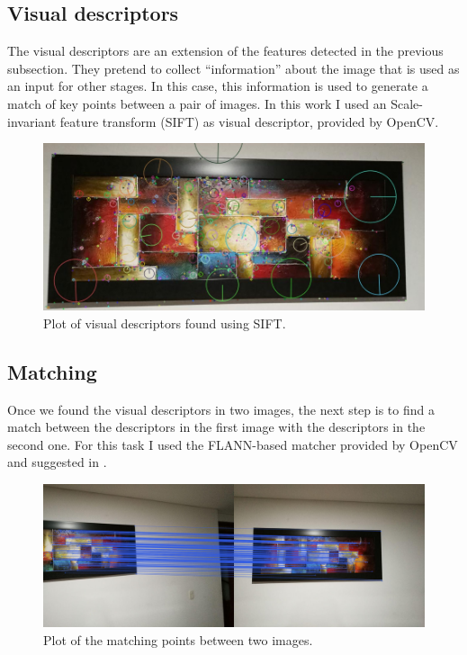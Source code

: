 \documentclass[journal]{IEEEtran}
\begin{document}
\subsection{Visual descriptors}

The visual descriptors are an extension of the features detected in the
previous subsection. They pretend to collect ``information'' about the
image that is used as an input for other stages. In this case, this
information is used to generate a match of key points between a pair of
images. In this work I used an Scale-invariant feature transform \cite{wiki:sift}
(SIFT) as visual descriptor, provided by OpenCV.

\begin{figure}[H]
\includegraphics[scale=0.2]{../img/descriptor_example}
\caption{Plot of visual descriptors found using SIFT.}
\label{canny}
\end{figure}

\subsection{Matching}

Once we found the visual descriptors in two images, the next step is to
find a match between the descriptors in the first image with the descriptors
in the second one. For this task I used the FLANN-based matcher provided
by OpenCV and suggested in \cite{opencv:tutorial}.

\begin{figure}[H]
\includegraphics[scale=0.1]{../img/matches1}
\caption{Plot of the matching points between two images.}
\label{canny}
\end{figure}
\end{document}
